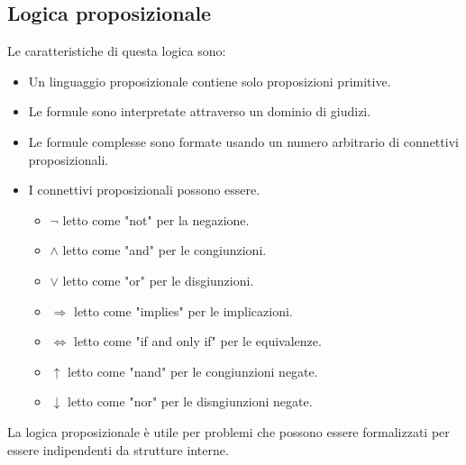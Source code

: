 \documentclass[../main.tex]{subfiles}
\begin{document}
    \subsection{Logica proposizionale}
    Le caratteristiche di questa logica sono:
    \begin{itemize}
        \item Un linguaggio proposizionale contiene solo proposizioni primitive.
        \item Le formule sono interpretate attraverso un dominio di giudizi.
        \item Le formule complesse sono formate usando un numero arbitrario di connettivi proposizionali.
        \item I connettivi proposizionali possono essere.
        \begin{itemize}
            \item $\lnot$ letto come "not" per la negazione.
            \item $\land$ letto come "and" per le congiunzioni.
            \item $\lor$ letto come "or" per le disgiunzioni.
            \item $\Longrightarrow$ letto come "implies" per le implicazioni.
            \item $\Longleftrightarrow$ letto come "if and only if" per le equivalenze.
            \item $\uparrow$ letto come "nand" per le congiunzioni negate.
            \item $\downarrow$ letto come "nor" per le disngiunzioni negate.
        \end{itemize} 
    \end{itemize}
    La logica proposizionale è utile per problemi che possono essere formalizzati per essere indipendenti da strutture interne.
    
\end{document}
